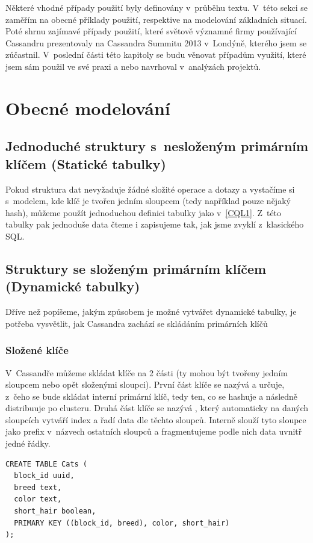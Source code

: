 Některé vhodné případy použití byly definovány v~průběhu textu. V~této sekci se zaměřím na obecné příklady použití, respektive na modelování základních situací. Poté shrnu zajímavé případy použití, které světově významné firmy používající Cassandru prezentovaly na Cassandra Summitu 2013 v~Londýně, kterého jsem se zúčastnil. V~poslední části této kapitoly se budu věnovat případům využití, které jsem sám použil ve své praxi a nebo navrhoval v~analýzách projektů. 

\section{Obecné modelování}

\subsection{Jednoduché struktury s~nesloženým primárním klíčem (Statické tabulky)}

Pokud struktura dat nevyžaduje žádné složité operace a dotazy a vystačíme si s~modelem, kde klíč je tvořen jedním sloupcem (tedy například pouze nějaký hash), můžeme použít jednoduchou definici tabulky jako v~\ref{CQL1}. Z~této tabulky pak jednoduše data čteme i zapisujeme tak, jak jsme zvyklí z~klasického SQL.

\subsection{Struktury se složeným primárním klíčem (Dynamické tabulky)}

Dříve než popíšeme, jakým způsobem je možné vytvářet dynamické tabulky, je potřeba vysvětlit, jak Cassandra zachází se skládáním primárních klíčů

\subsubsection*{Složené klíče}
V~Cassandře můžeme skládat klíče na 2 části (ty mohou být tvořeny jedním sloupcem nebo opět složenými sloupci). První část klíče se nazývá  a určuje, z~čeho se bude skládat interní primární klíč, tedy ten, co se hashuje a následně distribuuje po clusteru. Druhá část klíče se nazývá , který automaticky na daných sloupcích vytváří index a řadí data dle těchto sloupců. Interně slouží tyto sloupce jako prefix v~názvech ostatních sloupců a fragmentujeme podle nich data uvnitř jedné řádky. 

\begin{lstlisting}[caption={Ukázka složených klíčů},label=CQL2]
CREATE TABLE Cats (
  block_id uuid,
  breed text,
  color text,
  short_hair boolean,
  PRIMARY KEY ((block_id, breed), color, short_hair)
);
\end{lstlisting}


